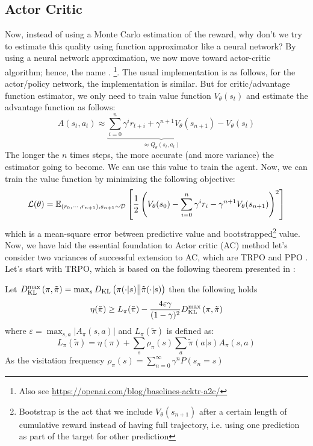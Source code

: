 \subsection{Actor Critic}
\label{sec:chap2-ator-critic}
Now, instead of using a Monte Carlo estimation of the reward, why don't we try to estimate this quality using function approximator like a neural network? By using a neural network approximation, we now move toward actor-critic algorithm; hence, the name . \cite{mnih2016asynchronous}\footnote{Also see  \url{https://openai.com/blog/baselines-acktr-a2c/}}. The usual implementation is as follows, for the actor/policy network, the implementation is similar. But for critic/advantage function estimator, we only need to train value function $V_\theta(s_t)$  and estimate the advantage function as follows:
\begin{equation}
    A(s_t, a_t) \approx \underbrace{\sum^n_{i=0} \gamma^i r_{t + i} + \gamma^{n+1} V_\theta(s_{n+1})}_{\approx Q_\theta(s_t, a_t)} - V_\theta(s_t)
\end{equation}
The longer the $n$ times steps, the more accurate (and more variance) the estimator going to become. We can use this value to train the agent. Now, we can train the value function by minimizing the following objective:
\begin{equation}
\label{eqn:chap2-ac-critic-loss}
    \mathcal{L}(\theta) = \mathbb{E}_{(r_0, \cdots, r_{n+1}), s_{n+1} \sim \mathcal{D}}\left[ \frac{1}{2}\left( V_\theta(s_0) - \sum^n_{i=0} \gamma^i r_i - \gamma^{n+1}V_\theta(s_{n+1}) \right)^2 \right]
\end{equation}
which is a mean-square error between predictive value and bootstrapped\footnote{Bootstrap is the act that we include $V_\theta(s_{n+1})$ after a certain length of cumulative reward instead of having full trajectory, i.e. using one prediction as part of the target for other prediction} value. Now, we have laid the essential foundation to Actor critic (AC) method let's consider two variances of successful extension to AC, which are TRPO \cite{schulman2015trust} and PPO \cite{schulman2017proximal}. Let's start with TRPO, which is based on the following theorem presented in \cite{schulman2015trust}:
\begin{theorem}
Let $D_{\mathrm{KL}}^{\max}\left( \pi, \tilde{\pi} \right) = \max_s D_{\mathrm{KL}}\left( \pi(\cdot | s) \big\| \tilde{\pi}(\cdot | s) \right)$  then the following holds
\begin{equation}
    \eta(\tilde{\pi}) \ge L_\pi(\tilde{\pi}) - \frac{4\varepsilon \gamma}{(1-\gamma)^2}D_{\mathrm{KL}}^{\max}\left( \pi, \tilde{\pi} \right)
\end{equation}
where $\varepsilon = \max_{s, a}|A_\pi(s, a)|$ and $L_\pi(\tilde{\pi})$ is defined as:
\begin{equation}
    L_\pi(\tilde{\pi}) = \eta(\pi) + \sum_s \rho_\pi(s) \sum_a \tilde{\pi}(a | s) A_\pi(s, a)
\end{equation}
As the visitation frequency $\rho_\pi(s) = \sum^\infty_{n=0} \gamma^n P(s_n = s)$
\end{theorem}
